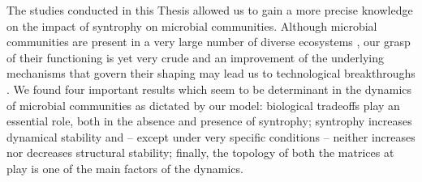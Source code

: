 \documentclass[12pt, titlepage]{report}
\begin{document}
%
%

The studies conducted in this Thesis allowed us to gain a more precise knowledge on the impact of syntrophy on microbial communities. Although microbial communities are present in a very large number of diverse ecosystems \cite{ley_worlds_2008, becerra-castro_wastewater_2015, falkowski_biogeochemical_1998}, our grasp of their functioning is yet very crude and an improvement of the underlying mechanisms that govern their shaping may lead us to technological breakthroughs \cite{kashyap_microbiome_2017}.
We found four important results which seem to be determinant in the dynamics of microbial communities as dictated by our model: biological tradeoffs play an essential role, both in the absence and presence of syntrophy; syntrophy increases dynamical stability and -- except under very specific conditions -- neither increases nor decreases structural stability; finally, the topology of both the matrices at play is one of the main factors of the dynamics.
\end{document}
